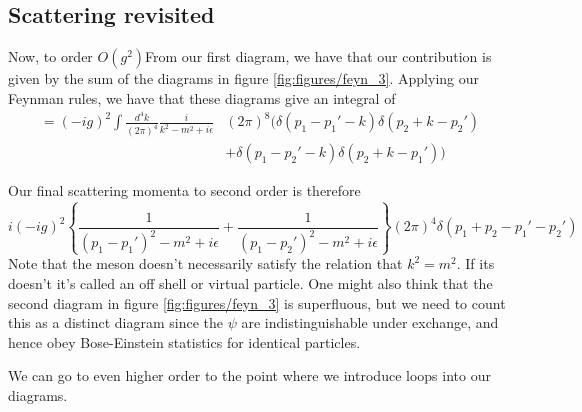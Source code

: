 \subsection{Scattering revisited} 
Now, to order $ O ( g ^ 2)  $From our first diagram, we have that our contribution is 
given by the sum of the diagrams in figure \ref{fig:figures/feyn_3}. Applying our 
Feynman rules, we have that these diagrams give an integral
of 
\begin{align*}
=( - i g ) ^ 2 \int \frac{ d^ 4 k }{ ( 2 \pi ) ^ 4 } \frac{ i }{ k ^ 2 - m ^ 2 + i \epsilon } &  ( 2 \pi ) ^ 8 ( \delta ( p_1 - p_1 ' - k ) \delta ( p_2 + k - p_2 ' ) \\
										      & + \delta ( p_1 - p_2' - k ) \delta ( p_2 + k - p_1 ' ) ) 	
\end{align*}

Our final scattering momenta to second order 
is therefore 
\[
i (  - i g ) ^ 2 \left\{  \frac{1}{ ( p_1 - p_1 ' ) ^ 2 - m ^ 2 + i \epsilon  } + \frac{1}{ ( p_1 - p_2 ' ) ^ 2 - m ^ 2 + i \epsilon }  \right\} ( 2 \pi ) ^ 4 \delta ( p_1 + p_2 - p_1' - p_2' )  
\] Note that the meson doesn't necessarily satisfy the relation 
that $ k ^ 2 = m ^ 2 $. 
If its doesn't it's called an off shell or virtual particle. 
One might also think that the second diagram in figure 
\ref{fig:figures/feyn_3} is superfluous, but 
we need to count this as a distinct diagram since 
the $ \psi $ are indistinguishable 
under exchange, and hence obey Bose-Einstein statistics
for identical particles.

We can go to even higher order to the point where we 
introduce loops into our diagrams. 


